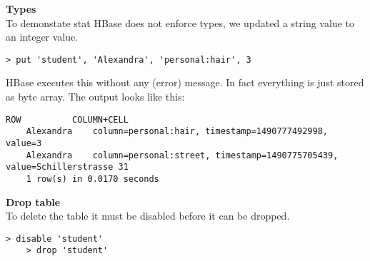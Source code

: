\textbf{Types} \\
To demonstate stat HBase does not enforce types, we updated a string value to an integer value.
\begin{lstlisting}[caption={put integer into cell},label=lst:put_integer]
	> put 'student', 'Alexandra', 'personal:hair', 3
\end{lstlisting}
HBase executes this without any (error) message. In fact everything is just stored as byte array.
The output looks like this:
\begin{lstlisting}[caption={output of the table scan 4},label=lst:table_scan_output_4]
	ROW          COLUMN+CELL
	Alexandra    column=personal:hair, timestamp=1490777492998, value=3
	Alexandra    column=personal:street, timestamp=1490775705439, value=Schillerstrasse 31
	1 row(s) in 0.0170 seconds
\end{lstlisting}

\textbf{Drop table} \\
To delete the table it must be disabled before it can be dropped.
\begin{lstlisting}[caption={drop table},label=lst:drop_table]
	> disable 'student'
	> drop 'student'
\end{lstlisting}